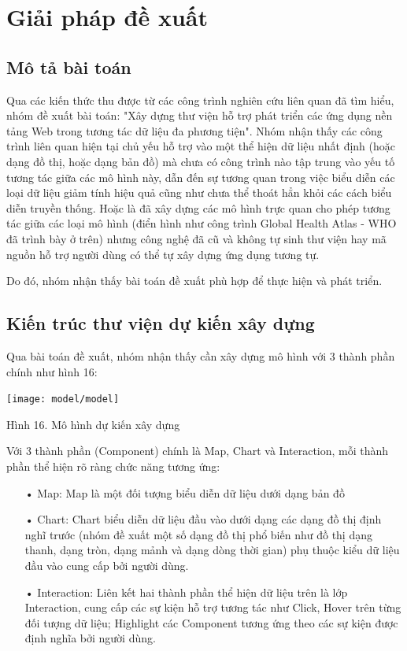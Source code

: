 \documentclass[12pt,a4paper]{article}
\begin{document}
\section{Giải pháp đề xuất}
\subsection{Mô tả bài toán}
Qua các kiến thức thu được từ các công trình nghiên cứu liên quan đã tìm hiểu, nhóm đề xuất bài toán: "Xây dựng thư viện hỗ trợ phát triển các ứng dụng nền tảng Web trong tương tác dữ liệu đa phương tiện". Nhóm nhận thấy các công trình liên quan hiện tại chủ yếu hỗ trợ vào một thể hiện dữ liệu nhất định (hoặc dạng đồ thị, hoặc dạng bản đồ) mà chưa có công trình nào tập trung vào yếu tố tương tác giữa các mô hình này, dẫn đến sự tương quan trong việc biểu diễn các loại dữ liệu giảm tính hiệu quả cũng như chưa thể thoát hẳn khỏi các cách biểu diễn truyền thống. Hoặc là đã  xây dựng các mô hình trực quan cho phép tương tác giữa các loại mô hình (điển hình như công trình Global Health Atlas - WHO đã trình bày ở trên) nhưng công nghệ đã cũ và không tự sinh thư viện hay mã nguồn hỗ trợ người dùng có thể tự xây dựng ứng dụng tương tự.

Do đó, nhóm nhận thấy bài toán đề xuất phù hợp để thực hiện và phát triển.

\subsection{Kiến trúc thư viện dự kiến xây dựng}
Qua bài toán đề xuất, nhóm nhận thấy cần xây dựng mô hình với 3 thành phần chính như hình 16:

	\begin{center}
    \texttt{[image: model/model]}
    
    Hình 16. Mô hình dự kiến xây dựng
	\end{center}

Với 3 thành phần (Component) chính là Map, Chart và Interaction, mỗi thành phần thể hiện rõ ràng chức năng tương ứng: 
\begin{itemize}
\item[•] Map: 
Map là một đối tượng biểu diễn dữ liệu dưới dạng bản đồ
\item[•] Chart:
Chart biểu diễn dữ liệu đầu vào dưới dạng các dạng đồ thị định nghĩ trước (nhóm đề xuất một số dạng đồ thị phổ biến như đồ thị dạng thanh, dạng tròn, dạng mảnh và dạng dòng thời gian) phụ thuộc kiểu dữ liệu đầu vào cung cấp bởi người dùng.
\item[•] Interaction:
Liên kết hai thành phần thể hiện dữ liệu trên là lớp Interaction, cung cấp các sự kiện hỗ trợ tương tác như Click, Hover trên từng đối tượng dữ liệu; Highlight các Component tương ứng theo các sự kiện được định nghĩa bởi người dùng.
\end{itemize}
\end{document}
